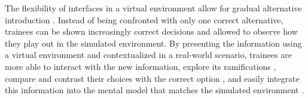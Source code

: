 The flexibility of interfaces in a virtual environment allow for gradual alternative introduction \citep{Erickson1993}. Instead of being confronted with only one correct alternative, trainees can be shown increasingly correct decisions and allowed to observe how they play out in the simulated environment. By presenting the information using a virtual environment and contextualized in a real-world scenario, trainees are more able to interact with the new information, explore its ramifications \citep{Erickson1993, Patterson2010}, compare and contrast their choices with the correct option \citep{Fowlkes2009}, and easily integrate this information into the mental model that matches the simulated environment \citep{Salzman1999}.
